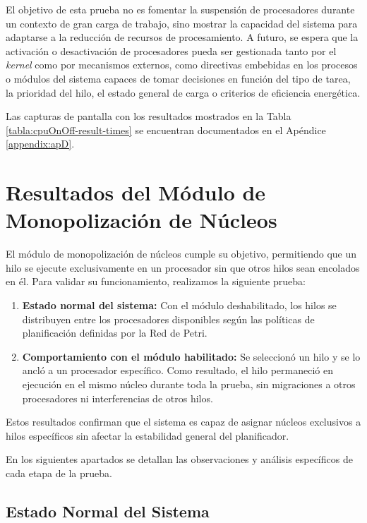El objetivo de esta prueba no es fomentar la suspensión de procesadores durante un contexto de gran carga de trabajo, sino mostrar la capacidad del sistema para adaptarse a la reducción de recursos de procesamiento. A futuro, se espera que la activación o desactivación de procesadores pueda ser gestionada tanto por el \textit{kernel} como por mecanismos externos, como directivas embebidas en los procesos o módulos del sistema capaces de tomar decisiones en función del tipo de tarea, la prioridad del hilo, el estado general de carga o criterios de eficiencia energética.\par

Las capturas de pantalla con los resultados mostrados en la Tabla \ref{tabla:cpuOnOff-result-times} se encuentran documentados en el Apéndice \ref{appendix:apD}.


\section{Resultados del Módulo de Monopolización de Núcleos}

El módulo de monopolización de núcleos cumple su objetivo, permitiendo que un hilo se ejecute exclusivamente en un procesador sin que otros hilos sean encolados en él. Para validar su funcionamiento, realizamos la siguiente prueba:

\begin{enumerate}
    \item \textbf{Estado normal del sistema:} Con el módulo deshabilitado, los hilos se distribuyen entre los procesadores disponibles según las políticas de planificación definidas por la Red de Petri.
    \item \textbf{Comportamiento con el módulo habilitado:} Se seleccionó un hilo y se lo ancló a un procesador específico. Como resultado, el hilo permaneció en ejecución en el mismo núcleo durante toda la prueba, sin migraciones a otros procesadores ni interferencias de otros hilos.
\end{enumerate}

Estos resultados confirman que el sistema es capaz de asignar núcleos exclusivos a hilos específicos sin afectar la estabilidad general del planificador.\par

En los siguientes apartados se detallan las observaciones y análisis específicos de cada etapa de la prueba.\par

\subsection{Estado Normal del Sistema}

